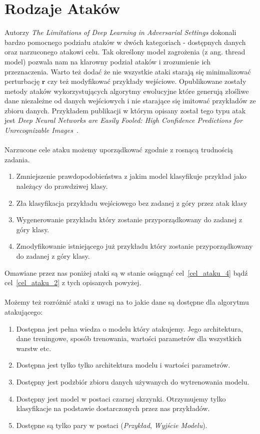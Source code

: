 \documentclass[
    left=2.5cm,         %
    right=2.5cm,        %
    top=2.5cm,          %
    bottom=3cm,         %
    bindingoffset=6mm,  %
    nohyphenation=false %
]{eiti/eiti-thesis}
\renewcommand{\vec}[1]{\mathbf{#1}}
\begin{document}
\newpage

\section{Rodzaje Ataków}
Autorzy
\textit{The Limitations of Deep Learning in Adversarial Settings}\cite{DBLP:journals/corr/PapernotMJFCS15}
dokonali bardzo pomocnego podziału ataków w dwóch kategoriach - dostępnych danych oraz narzuconego atakowi celu. Tak określony
model zagrożenia (z ang. thread model) pozwala nam na klarowny podział ataków i zrozumienie ich przeznaczenia. Warto też dodać
że nie wszystkie ataki starają się minimalizować perturbację $\vec{r}$ czy też modyfikować przykłady wejściowe. Opublikowane zostały
metody ataków wykorzystujących algorytmy ewolucyjne które generują złośliwe dane niezależne od danych wejściowych i nie starające się
imitować przykładów ze zbioru danych. Przykładem publikacji w którym opisany został tego typu atak jest \textit{Deep Neural Networks are Easily Fooled: High Confidence Predictions for Unrecognizable Images}~\cite{DBLP:journals/corr/NguyenYC14}.
\\~\\
Narzucone cele ataku możemy uporządkować zgodnie z rosnącą trudnością zadania.
\begin{enumerate}
    \item Zmniejszenie prawdopodobieństwa z jakim model klasyfikuje przykład jako należący do prawdziwej klasy.
    \item \label{cel_ataku_2} Zła klasyfikacja przykładu wejściowego bez zadanej z góry przez atak klasy
    \item Wygenerowanie przykładu który zostanie przyporządkowany do zadanej z góry klasy.
    \item \label{cel_ataku_4} Zmodyfikowanie istniejącego już przykładu który zostanie przyporządkowany do zadanej z góry klasy.
\end{enumerate}
Omawiane przez nas poniżej ataki są w stanie osiągnąć cel~\ref{cel_ataku_4} bądź cel~\ref{cel_ataku_2} z tych opisanych powyżej.
\\~\\
Możemy też rozróżnić ataki z uwagi na to jakie dane są dostępne dla algorytmu atakującego:
\begin{enumerate}
    \item \label{atak_1} Dostępna jest pełna wiedza o modelu który atakujemy. Jego architektura, dane treningowe, sposób trenowania, wartości parametrów dla wszystkich warstw etc.
    \item \label{atak_2} Dostępna jest tylko tylko architektura modelu i wartości parametrów.
    \item Dostępny jest podzbiór zbioru danych używanych do wytrenowania modelu.
    \item Dostępny jest model w postaci czarnej skrzynki. Otrzymujemy tylko klasyfikacje na podstawie dostarczonych przez nas przykładów.
    \item Dostępne są tylko pary w postaci (\textit{Przykład}, \textit{Wyjście Modelu}).
\end{enumerate}
\end{document}
